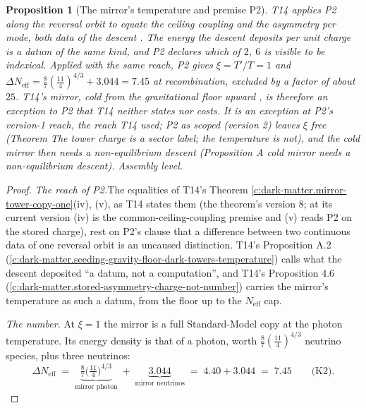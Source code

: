 \documentclass[11pt]{article}
\newtheorem{proposition}[theorem]{Proposition}
\theoremstyle{definition}
\theoremstyle{plain}
\newcommand{\changedmark}[2]{\marginpar{\raggedright\scriptsize\color{#1}#2}}
\providecommand{\Neff}{}\renewcommand{\Neff}{N_{\mathrm{eff}}}
\begin{document}
\begin{proposition}[The mirror's temperature and premise P2]\label{c:dark-tower-matter.mirrors-temperature-p2}
\changedmark{BurntOrange}{changed since the deposit}
T14 applies P2 along the reversal orbit to equate the ceiling coupling and the asymmetry per mode, both data of the descent \cite[Thm.~4.3(iv), (v)]{ButlerT14}. The energy the descent deposits per unit charge is a datum of the same kind, and P2 declares which of $2$, $6$ is visible to be indexical. Applied with the same reach, P2 gives $\xi = T'/T = 1$ and $\Delta\Neff = \tfrac{8}{7}(\tfrac{11}{4})^{4/3} + 3.044 = 7.45$ at recombination, excluded by a factor of about $25$. T14's mirror, cold from the gravitational floor upward \cite[Prop.~4.6, Prop.~A.2]{ButlerT14}, is therefore an exception to P2 that T14 neither states nor costs. It is an exception at P2's version-1 reach, the reach T14 used; P2 as scoped (version 2) leaves $\xi$ free (Theorem \emph{The tower charge is a sector label; the temperature is not}), and the cold mirror then needs a non-equilibrium descent (Proposition \emph{A cold mirror needs a non-equilibrium descent}). Assembly level.
\end{proposition}
\begin{proof}
\textit{The reach of P2.}\enspace The equalities of T14's Theorem \ref{c:dark-matter.mirror-tower-copy-one}(iv), (v), as T14 states them (the theorem's version 8; at its current version (iv) is the common-ceiling-coupling premise and (v) reads P2 on the stored charge), rest on P2's clause that a difference between two continuous data of one reversal orbit is an uncaused distinction. T14's Proposition A.2 (\ref{c:dark-matter.seeding-gravity-floor-dark-towers-temperature}) calls what the descent deposited ``a datum, not a computation'', and T14's Proposition 4.6 (\ref{c:dark-matter.stored-asymmetry-charge-not-number}) carries the mirror's temperature as such a datum, from the floor up to the $\Neff$ cap.



\emph{The number.}  At $\xi = 1$ the mirror is a full Standard-Model copy at the photon temperature. Its energy density is that of a photon, worth $\tfrac{8}{7}(\tfrac{11}{4})^{4/3}$ neutrino species, plus three neutrinos:
\[
\Delta\Neff \;=\; \underbrace{\tfrac{8}{7}\bigl(\tfrac{11}{4}\bigr)^{4/3}}_{\text{mirror photon}} \;+\; \underbrace{3.044}_{\text{mirror neutrinos}} \;=\; 4.40 + 3.044 \;=\; 7.45 \qquad \text{(K2)}.
\]

\end{proof}
\end{document}
